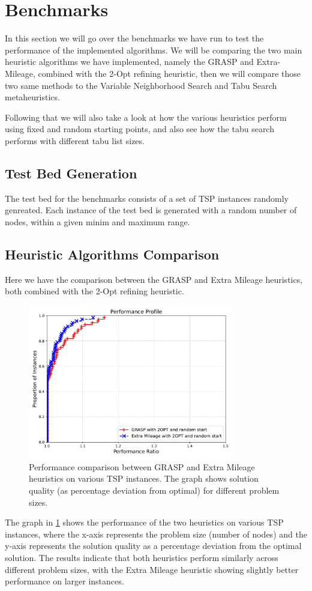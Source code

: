 \documentclass{article}
\begin{document}
\section{Benchmarks}
In this section we will go over the benchmarks we have run to test the performance of the implemented algorithms. 
We will be comparing the two main heuristic algorithms we have implemented, namely the GRASP and Extra-Mileage, combined with the 2-Opt refining heuristic, 
then we will compare those two same methods to the Variable Neighborhood Search and Tabu Search metaheuristics.

Following that we will also take a look at how the various heuristics perform using fixed and random starting points, and also see how 
the tabu search performs with different tabu list sizes.

\subsection{Test Bed Generation}
The test bed for the benchmarks consists of a set of TSP instances randomly genreated. Each instance of the test bed is generated with a random number of nodes, 
within a given minim and maximum range. 

\subsection{Heuristic Algorithms Comparison}
Here we have the comparison between the GRASP and Extra Mileage heuristics, both combined with the 2-Opt refining heuristic.
\begin{figure}[!ht]
	\centering
	\includegraphics[width=0.8\textwidth]{plots/grasp_vs_extra.pdf}
	\caption{Performance comparison between GRASP and Extra Mileage heuristics on various TSP instances. The graph shows solution quality (as percentage deviation from optimal) for different problem sizes.}
	\label{fig:grasp_vs_extra_mileage}
\end{figure}
The graph in \ref{fig:grasp_vs_extra_mileage} shows the performance of the two heuristics on various TSP instances, 
where the x-axis represents the problem size (number of nodes) and the y-axis represents the solution quality as a percentage deviation from the optimal solution. 
The results indicate that both heuristics perform similarly across different problem sizes, with the Extra Mileage heuristic showing slightly better performance on larger instances.
\end{document}
